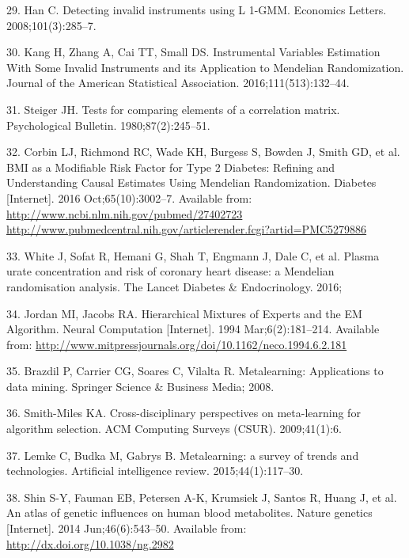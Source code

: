 \documentclass[]{article}
\begin{document}
\hypertarget{ref-Han2008}{}
29. Han C. Detecting invalid instruments using L 1-GMM. Economics
Letters. 2008;101(3):285--7.

\hypertarget{ref-Kang2016}{}
30. Kang H, Zhang A, Cai TT, Small DS. Instrumental Variables Estimation
With Some Invalid Instruments and its Application to Mendelian
Randomization. Journal of the American Statistical Association.
2016;111(513):132--44.

\hypertarget{ref-Steiger1980}{}
31. Steiger JH. Tests for comparing elements of a correlation matrix.
Psychological Bulletin. 1980;87(2):245--51.

\hypertarget{ref-Corbin2016}{}
32. Corbin LJ, Richmond RC, Wade KH, Burgess S, Bowden J, Smith GD, et
al. BMI as a Modifiable Risk Factor for Type 2 Diabetes: Refining and
Understanding Causal Estimates Using Mendelian Randomization. Diabetes
{[}Internet{]}. 2016 Oct;65(10):3002--7. Available from:
\href{http://www.ncbi.nlm.nih.gov/pubmed/27402723\%20http://www.pubmedcentral.nih.gov/articlerender.fcgi?artid=PMC5279886}{http://www.ncbi.nlm.nih.gov/pubmed/27402723 http://www.pubmedcentral.nih.gov/articlerender.fcgi?artid=PMC5279886}

\hypertarget{ref-white2016plasma}{}
33. White J, Sofat R, Hemani G, Shah T, Engmann J, Dale C, et al. Plasma
urate concentration and risk of coronary heart disease: a Mendelian
randomisation analysis. The Lancet Diabetes \& Endocrinology. 2016;

\hypertarget{ref-Jordan1994}{}
34. Jordan MI, Jacobs RA. Hierarchical Mixtures of Experts and the EM
Algorithm. Neural Computation {[}Internet{]}. 1994 Mar;6(2):181--214.
Available from:
\url{http://www.mitpressjournals.org/doi/10.1162/neco.1994.6.2.181}

\hypertarget{ref-brazdil2008metalearning}{}
35. Brazdil P, Carrier CG, Soares C, Vilalta R. Metalearning:
Applications to data mining. Springer Science \& Business Media; 2008.

\hypertarget{ref-smith2009cross}{}
36. Smith-Miles KA. Cross-disciplinary perspectives on meta-learning for
algorithm selection. ACM Computing Surveys (CSUR). 2009;41(1):6.

\hypertarget{ref-lemke2015metalearning}{}
37. Lemke C, Budka M, Gabrys B. Metalearning: a survey of trends and
technologies. Artificial intelligence review. 2015;44(1):117--30.

\hypertarget{ref-Shin2014}{}
38. Shin S-Y, Fauman EB, Petersen A-K, Krumsiek J, Santos R, Huang J, et
al. An atlas of genetic influences on human blood metabolites. Nature
genetics {[}Internet{]}. 2014 Jun;46(6):543--50. Available from:
\url{http://dx.doi.org/10.1038/ng.2982}
\end{document}
